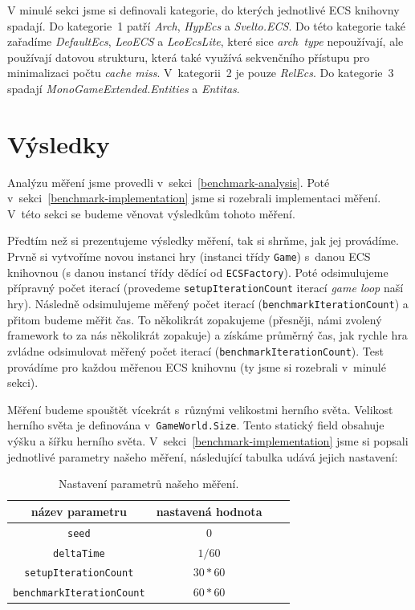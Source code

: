 V minulé sekci jsme si definovali kategorie, do kterých jednotlivé ECS knihovny spadají. Do kategorie~1 patří \textit{Arch}, \textit{HypEcs} a \textit{Svelto.ECS}. Do této kategorie také zařadíme \textit{DefaultEcs}, \textit{LeoECS} a \textit{LeoEcsLite}, které sice \textit{arch~type} nepoužívají, ale používají datovou strukturu, která také využívá sekvenčního přístupu pro minimalizaci počtu \textit{cache miss}. V~kategorii~2 je pouze \textit{RelEcs}. Do kategorie~3 spadají \textit{MonoGameExtended.Entities} a \textit{Entitas}.

\section{Výsledky}
\label{sec:benchmark-results}
Analýzu měření jsme provedli v~sekci~\ref{benchmark-analysis}. Poté v~sekci~\ref{benchmark-implementation} jsme si rozebrali implementaci měření. V~této sekci se budeme věnovat výsledkům tohoto měření.

Předtím než si prezentujeme výsledky měření, tak si shrňme, jak jej provádíme. Prvně si vytvoříme novou instanci hry (instanci třídy \texttt{Game}) s~danou ECS knihovnou (s danou instancí třídy dědící od \texttt{ECSFactory}). Poté odsimulujeme přípravný počet iterací (provedeme \texttt{setupIterationCount} iterací \textit{game loop} naší hry). Následně odsimulujeme měřený počet iterací (\texttt{benchmarkIterationCount}) a přitom budeme měřit čas. To několikrát zopakujeme (přesněji, námi zvolený framework to za nás několikrát zopakuje) a získáme průměrný čas, jak rychle hra zvládne odsimulovat měřený počet iterací (\texttt{benchmarkIterationCount}). Test provádíme pro každou měřenou ECS knihovnu (ty jsme si rozebrali v~minulé sekci).

Měření budeme spouštět vícekrát s~různými velikostmi herního světa. Velikost herního světa je definována v~\texttt{GameWorld.Size}. Tento statický field obsahuje výšku a šířku herního světa. V~sekci~\ref{benchmark-implementation} jsme si popsali jednotlivé parametry našeho měření, následující tabulka udává jejich nastavení:

\begin{table}[!htb]
    \centering\footnotesize\sf
    \begin{tabular}{c c c c}
        \toprule
        název parametru & nastavená hodnota \\
        \midrule
        \texttt{seed} & $0$ \\
        \texttt{deltaTime} & $1 / 60$ \\
        \texttt{setupIterationCount} & $30 * 60$ \\
        \texttt{benchmarkIterationCount} & $60 * 60$ \\
        \bottomrule
    \end{tabular}
    \caption{Nastavení parametrů našeho měření.}
    \label{tab:benchmark-parameters}
\end{table}

